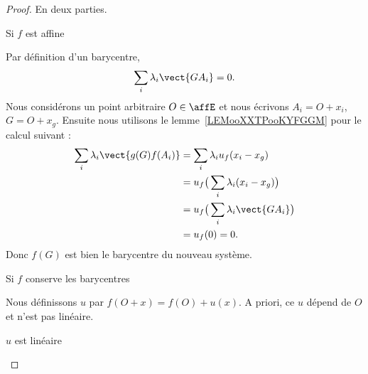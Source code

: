 \begin{proof}
    En deux parties.
    \begin{subproof}
        \item[Si \( f\) est affine]

            Par définition d'un barycentre,
            \begin{equation}
                \sum_i\lambda_i\vect{ GA_i }=0.
            \end{equation}
            Nous considérons un point arbitraire \( O\in\affE\) et nous écrivons \( A_i=O+x_i\), \( G=O+x_g\). Ensuite nous utilisons le lemme~\ref{LEMooXXTPooKYFGGM} pour le calcul suivant :
            \begin{subequations}
                \begin{align}
                    \sum_i\lambda_i\vect{ g(G)f(A_i) }&=\sum_i\lambda_iu_f(x_i-x_g)\\
                    &=u_f\big( \sum_i\lambda_i(x_i-x_g) \big)\\
                    &=u_f\big( \sum_i\lambda_i\vect{ GA_i } \big)\\
                    &=u_f(0)=0.
                \end{align}
            \end{subequations}
            Donc \( f(G)\) est bien le barycentre du nouveau système.

        \item[Si \( f\) conserve les barycentres]

            Nous définissons \( u\) par \( f(O+x)=f(O)+u(x)\). A priori, ce \( u\) dépend de \( O\) et n'est pas linéaire.
            \begin{subproof}
            \item[\( u\) est linéaire]


\end{subproof}
\end{subproof}
\end{proof}
